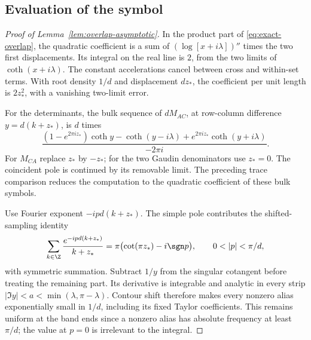 \subsection{Evaluation of the symbol}
\label{sec:overlap-symbol}
\begin{proof}[Proof of Lemma~\ref{lem:overlap-asymptotic}]
In the product part of \eqref{eq:exact-overlap}, the quadratic coefficient
is a sum of
\((\log[x+i\lambda])''\) times the two first displacements. Its integral
on the real line is \(2\), from the two limits of \(\coth(x+i\lambda)\).
The constant accelerations cancel between cross and within-set terms.
With root density \(1/d\) and displacement \(dz_*\), the coefficient
per unit length is \(2z_*^2\), with a vanishing two-limit error.

For the determinants, the bulk sequence of \(dM_{AC}\), at row-column
difference \(y=d(k+z_*)\), is \(d\) times
\begin{equation}\label{eq:overlap-toeplitz}
 \frac{(1-e^{2\pi i z_*})\coth y-\coth(y-i\lambda)
                         +e^{2\pi i z_*}\coth(y+i\lambda)}
      {-2\pi i}.
\end{equation}
For \(M_{CA}\) replace \(z_*\) by \(-z_*\); for the two Gaudin
denominators use \(z_*=0\). The coincident pole is continued by its
removable limit. The preceding trace comparison reduces the computation
to the quadratic coefficient of these bulk symbols.

Use Fourier exponent \(-ipd(k+z_*)\).
The simple pole contributes the shifted-sampling identity
\[
 \sum_{k\in\Z}\frac{e^{-ipd(k+z_*)}}{k+z_*}
    =\pi\bigl(\cot(\pi z_*)-i\sgn p\bigr),
 \qquad 0<|p|<\pi/d,
\]
with symmetric summation. Subtract \(1/y\) from the singular cotangent
before treating the remaining part. Its derivative is integrable and
analytic in every strip
\(|\Im y|<a<\min(\lambda,\pi-\lambda)\).
Contour shift therefore makes every nonzero alias exponentially small
in \(1/d\), including its fixed Taylor coefficients. This remains
uniform at the band ends since a nonzero alias has absolute frequency
at least \(\pi/d\); the value at \(p=0\) is irrelevant to the integral.


\end{proof}
